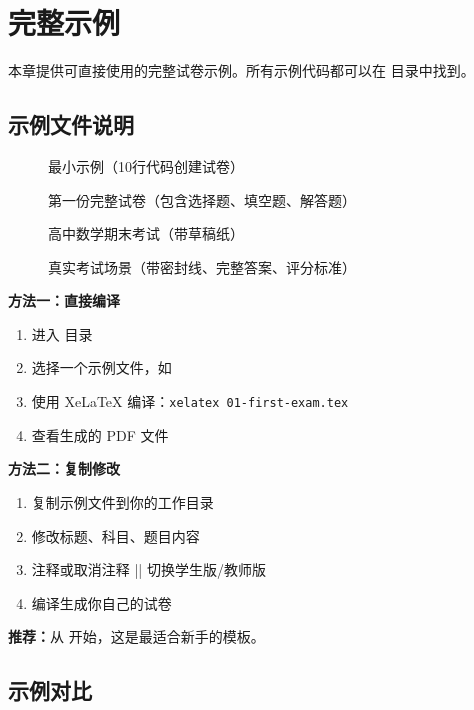 
\section{完整示例}

本章提供可直接使用的完整试卷示例。所有示例代码都可以在  目录中找到。

\subsection{示例文件说明}

\begin{description}
  \item[] 最小示例（10行代码创建试卷）
  \item[] 第一份完整试卷（包含选择题、填空题、解答题）
  \item[] 高中数学期末考试（带草稿纸）
  \item[] 真实考试场景（带密封线、完整答案、评分标准）
\end{description}

\begin{tcolorbox}[colback=blue!5!white, colframe=blue!75!black, title=\textbf{如何使用这些示例}]
\textbf{方法一：直接编译}
\begin{enumerate}
  \item 进入  目录
  \item 选择一个示例文件，如 
  \item 使用 XeLaTeX 编译：\texttt{xelatex 01-first-exam.tex}
  \item 查看生成的 PDF 文件
\end{enumerate}

\textbf{方法二：复制修改}
\begin{enumerate}
  \item 复制示例文件到你的工作目录
  \item 修改标题、科目、题目内容
  \item 注释或取消注释 |\examsetup| 切换学生版/教师版
  \item 编译生成你自己的试卷
\end{enumerate}

\textbf{推荐：}从  开始，这是最适合新手的模板。
\end{tcolorbox}

\subsection{示例对比}

